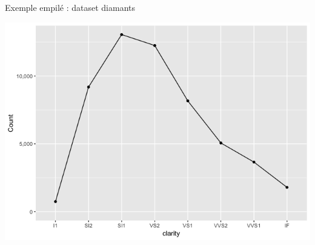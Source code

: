 \documentclass[french]{beamer}
\begin{document}
\begin{frame}{Exemple empilé : dataset diamants}
\begin{center}
	\includegraphics[height=0.8\textheight]{diamonds_sum}
\end{center}
\end{frame}
\end{document}
